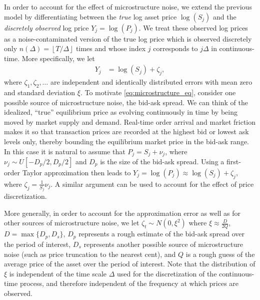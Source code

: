 \documentclass[10pt]{article}
\begin{document}
In order to account for the effect of microstructure noise, we extend the previous model by differentiating between the \textit{true} log asset price $\log(S_j)$ and the \textit{discretely observed} log price $Y_j = \log(P_j)$. We treat these observed log prices as a noise-contaminated version of the true log price which is observed discretely only $n(\Delta) = \left\lfloor T/\Delta \right\rfloor$ times and whose index $j$ corresponds to $j\Delta$ in continuous-time.  More specifically, we let
\begin{align}\label{eq:microstructure_eq}
  Y_j &= \log (S_j) + \zeta_j,
\end{align}
where $\zeta_1, \zeta_2, \ldots$ are independent and identically distributed errors with mean zero and standard deviation $\xi$.  To motivate \eqref{eq:microstructure_eq}, consider one possible source of microstructure noise, the bid-ask spread. We can think of the idealized, ``true'' equilibrium price as evolving continuously in time by being moved by market supply and demand. Real-time order arrival and market friction makes it so that transaction prices are recorded at the highest bid or lowest ask levels only, thereby bounding the equilibrium market price in the bid-ask range. In this case it is natural to assume that $P_j = S_j + \nu_j$, where $\nu_j \sim U[ - D_p/2, D_p/2]$ and $D_p$ is the size of the bid-ask spread.  Using a first-order Taylor approximation then leads to $Y_j = \log(P_j) \approx \log(S_j) + \zeta_j$, where $\zeta_j = \frac{1}{S_j}\nu_j$.  A similar argument can be used to account for the effect of price discretization.

More generally, in order to account for the approximation error as well as for other sources of microstructure noise, we let $\zeta_t \sim N (0, \xi^2)$ where $\xi \approx \frac{D}{2Q}$, $D = \max\{ D_p, D_s\}$, $D_p$ represents a rough estimate of the bid-ask spread over the period of interest, $D_s$ represents another possible source of microstructure noise (such as price truncation to the nearest cent), and $Q$ is a rough guess of the average price of the asset over the period of interest.  Note that the distribution of $\xi$ is independent of the time scale $\Delta$ used for the discretization of the continuous-time process, and therefore independent of the frequency at which prices are observed.
\end{document}
